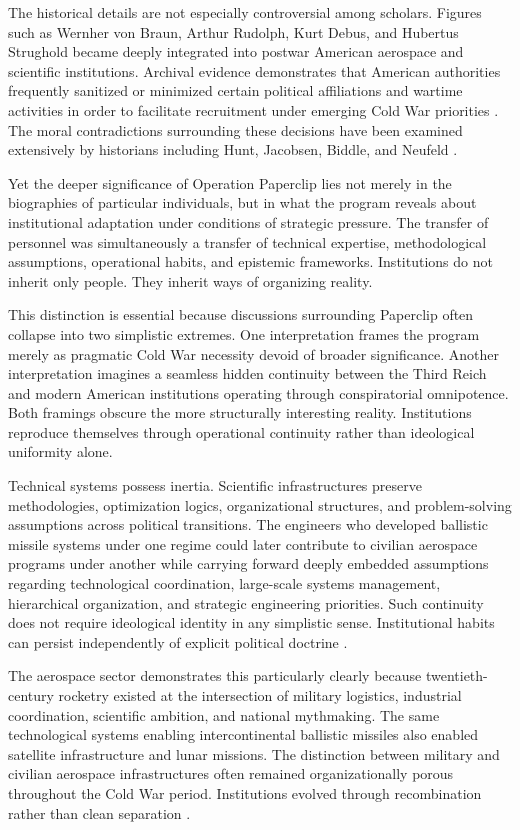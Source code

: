 \documentclass[11pt,a4paper]{article}
\begin{document}
The historical details are not especially controversial among scholars. Figures such as Wernher von Braun, Arthur Rudolph, Kurt Debus, and Hubertus Strughold became deeply integrated into postwar American aerospace and scientific institutions. Archival evidence demonstrates that American authorities frequently sanitized or minimized certain political affiliations and wartime activities in order to facilitate recruitment under emerging Cold War priorities \cite{hunt1991}. The moral contradictions surrounding these decisions have been examined extensively by historians including Hunt, Jacobsen, Biddle, and Neufeld \cite{hunt1991,jacobsen2014,biddle2009,neufeld2007}.

Yet the deeper significance of Operation Paperclip lies not merely in the biographies of particular individuals, but in what the program reveals about institutional adaptation under conditions of strategic pressure. The transfer of personnel was simultaneously a transfer of technical expertise, methodological assumptions, operational habits, and epistemic frameworks. Institutions do not inherit only people. They inherit ways of organizing reality.

This distinction is essential because discussions surrounding Paperclip often collapse into two simplistic extremes. One interpretation frames the program merely as pragmatic Cold War necessity devoid of broader significance. Another interpretation imagines a seamless hidden continuity between the Third Reich and modern American institutions operating through conspiratorial omnipotence. Both framings obscure the more structurally interesting reality. Institutions reproduce themselves through operational continuity rather than ideological uniformity alone.

Technical systems possess inertia. Scientific infrastructures preserve methodologies, optimization logics, organizational structures, and problem-solving assumptions across political transitions. The engineers who developed ballistic missile systems under one regime could later contribute to civilian aerospace programs under another while carrying forward deeply embedded assumptions regarding technological coordination, large-scale systems management, hierarchical organization, and strategic engineering priorities. Such continuity does not require ideological identity in any simplistic sense. Institutional habits can persist independently of explicit political doctrine \cite{simpson1988}.

The aerospace sector demonstrates this particularly clearly because twentieth-century rocketry existed at the intersection of military logistics, industrial coordination, scientific ambition, and national mythmaking. The same technological systems enabling intercontinental ballistic missiles also enabled satellite infrastructure and lunar missions. The distinction between military and civilian aerospace infrastructures often remained organizationally porous throughout the Cold War period. Institutions evolved through recombination rather than clean separation \cite{sellier2003}.
\end{document}
